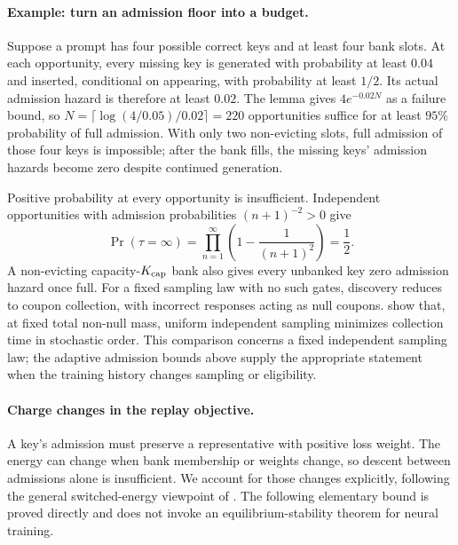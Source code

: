 \documentclass{article}
\newcommand{\1}{\mathbf 1}
\theoremstyle{remark}
\theoremstyle{definition}
\theoremstyle{plain}
\begin{document}
\paragraph{Example: turn an admission floor into a budget.}
Suppose a prompt has four possible correct keys and at least four bank slots.
At each opportunity, every missing key is generated with probability at least
$0.04$ and inserted, conditional on appearing, with probability at least
$1/2$. Its actual admission hazard is therefore at least $0.02$. The lemma
gives $4e^{-0.02N}$ as a failure bound, so
$N=\lceil\log(4/0.05)/0.02\rceil=220$ opportunities suffice for at least
$95\%$ probability of full admission. With only two non-evicting slots,
full admission of those four keys is impossible; after the bank fills, the
missing keys' admission hazards become zero despite continued generation.

Positive probability at every opportunity is insufficient. Independent
opportunities with admission probabilities $(n+1)^{-2}>0$ give
\[
 \Pr(\tau=\infty)=\prod_{n=1}^\infty
 \left(1-\frac1{(n+1)^2}\right)=\frac12.
\]
A non-evicting capacity-$K_{\rm cap}$ bank also gives every unbanked key zero admission
hazard once full. For a fixed sampling law with no such gates, discovery
reduces to coupon collection, with incorrect responses acting as null
coupons. \citet[Theorems~2--3]{anceaume2015coupon} show that, at fixed total
non-null mass, uniform independent sampling minimizes collection time in
stochastic order. This comparison concerns a fixed independent sampling
law; the adaptive admission bounds above supply the appropriate statement
when the training history changes sampling or eligibility.

\paragraph{Charge changes in the replay objective.}
A key's admission must preserve a representative with positive loss weight.
The energy can change when bank membership or weights change, so descent
between admissions alone is insufficient. We account for those changes
explicitly, following the general switched-energy viewpoint of
\citet{branicky1998multiple}. The following elementary bound is proved
directly and does not invoke an equilibrium-stability theorem for neural
training.
\end{document}
